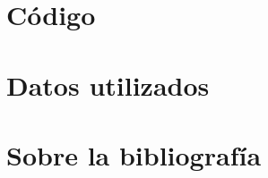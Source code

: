 \documentclass[utf8,11pt]{book}
\begin{document}
\chapter{Código}
\label{apdx:codigo}


\chapter{Datos utilizados}
\label{apdx:datos-utilizados}


\listoffigures

\listoftables


\listoftheorems
{}


\lstlistoflistings
{}

\cleardoublepage
\printindex

\chapter{Sobre la bibliografía}
\thispagestyle{empty}
\label{chap:sobre-la-bibliografia}



\setcounter{footnote}{0}
% 
\printbibliography
{}
\end{document}
